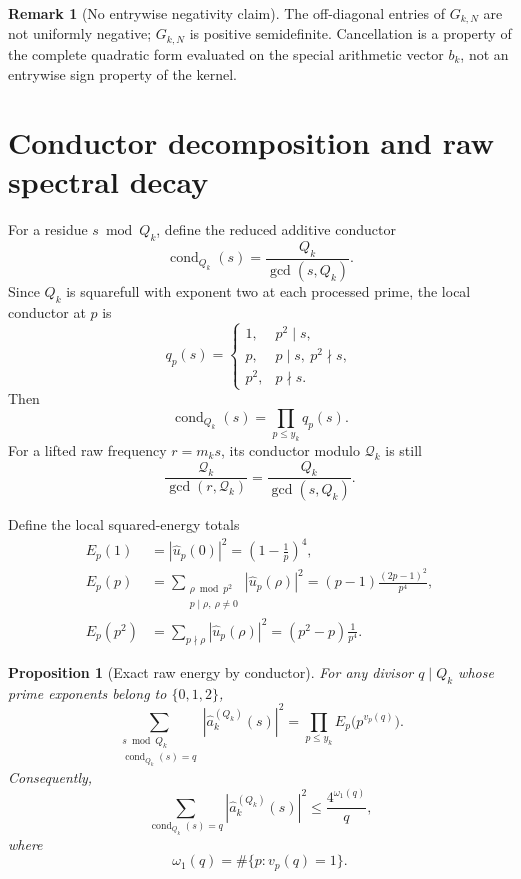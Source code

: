 \documentclass[11pt]{article}
\newtheorem{proposition}[theorem]{Proposition}
\theoremstyle{definition}
\newtheorem{remark}[theorem]{Remark}
\newcommand{\cond}{\operatorname{cond}}
\begin{document}
\begin{remark}[No entrywise negativity claim]
The off-diagonal entries of $G_{k,N}$ are not uniformly negative; $G_{k,N}$ is positive semidefinite.  Cancellation is a property of the complete quadratic form evaluated on the special arithmetic vector $b_k$, not an entrywise sign property of the kernel.
\end{remark}

\section{Conductor decomposition and raw spectral decay}

For a residue $s\bmod Q_k$, define the reduced additive conductor
\begin{equation}\label{eq:conductor}
\cond_{Q_k}(s)=\frac{Q_k}{\gcd(s,Q_k)}.
\end{equation}
Since $Q_k$ is squarefull with exponent two at each processed prime, the local conductor at $p$ is
\[
q_p(s)=
\begin{cases}
1,&p^2\mid s,\\
p,&p\mid s,\ p^2\nmid s,\\
p^2,&p\nmid s.
\end{cases}
\]
Then
\[
\cond_{Q_k}(s)=\prod_{p\le y_k}q_p(s).
\]
For a lifted raw frequency $r=m_ks$, its conductor modulo $\mathcal Q_k$ is still
\[
\frac{\mathcal Q_k}{\gcd(r,\mathcal Q_k)}
=\frac{Q_k}{\gcd(s,Q_k)}.
\]

Define the local squared-energy totals
\begin{align*}
E_p(1)&=|\widehat u_p(0)|^2=\left(1-\frac1p\right)^4,\\
E_p(p)&=\sum_{\substack{\rho\bmod p^2\\p\mid\rho,\ \rho\ne0}}
|\widehat u_p(\rho)|^2
=(p-1)\frac{(2p-1)^2}{p^4},\\
E_p(p^2)&=\sum_{p\nmid\rho}|\widehat u_p(\rho)|^2
=(p^2-p)\frac1{p^4}.
\end{align*}

\begin{proposition}[Exact raw energy by conductor]\label{prop:raw-conductor-energy}
For any divisor $q\mid Q_k$ whose prime exponents belong to $\{0,1,2\}$,
\begin{equation}\label{eq:exact-conductor-energy}
\sum_{\substack{s\bmod Q_k\\\cond_{Q_k}(s)=q}}
|\widehat a_k^{(Q_k)}(s)|^2
=
\prod_{p\le y_k}E_p\bigl(p^{v_p(q)}\bigr).
\end{equation}
Consequently,
\begin{equation}\label{eq:raw-energy-bound}
\sum_{\cond_{Q_k}(s)=q}|\widehat a_k^{(Q_k)}(s)|^2
\le
\frac{4^{\omega_1(q)}}{q},
\end{equation}
where
\[
\omega_1(q)=\#\{p:v_p(q)=1\}.
\]
\end{proposition}
\end{document}
